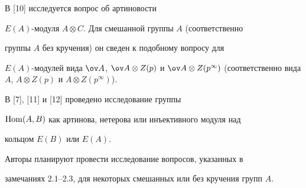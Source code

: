  


\begin{notes} 


В [10] исследуется вопрос об артиновости 


$E(A)$-модуля $A\otimes C$. Для смешанной группы $A$ (соответственно 


группы $A$ без кручения) он сведен к подобному вопросу для 


$E(A)$-модулей вида $\ov A$, $\ov A\otimes Z(p)$ и $\ov A\otimes 


Z(p^\infty)$ (соответственно вида $A$, $A\otimes Z(p)$ и $A\otimes 


Z(p^\infty)$). 


\end{notes} 


 


\begin{notes} 


В [7], [11] и [12] проведено исследование группы 


$\operatorname{Hom}(A,B)$ как артинова, нетерова или инъективного модуля над 


кольцом $E(B)$ или $E(A)$. 


\end{notes} 


 


Авторы планируют провести исследование вопросов, указанных в 


замечаниях 2.1--2.3, для некоторых смешанных или без кручения групп $A$. 


 


